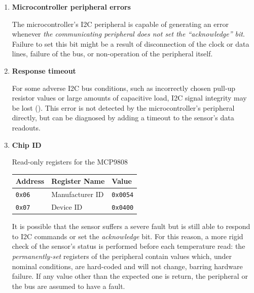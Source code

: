 \documentclass[a4paper,nobib]{tufte-book}
\begin{document}
\begin{enumerate}
	\item \textbf{Microcontroller peripheral errors}
	
	The microcontroller's \ac{I2C} peripheral is capable of generating an error whenever \emph{the communicating peripheral does not set the ``acknowledge'' bit}. Failure to set this bit might be a result of disconnection of the clock or data lines, failure of the bus, or non-operation of the peripheral itself.
	
	\item \textbf{Response timeout}
	
	For some adverse \ac{I2C} bus conditions, such as incorrectly chosen pull-up resistor values or large amounts of capacitive load, \ac{I2C} signal integrity may be lost (). This error is not detected by the microcontroller's peripheral directly, but can be diagnosed by adding a timeout to the sensor's data readouts.
	
	\item \textbf{Chip ID}
	
	\begin{margintable}
		\centering
		\caption{Read-only registers for the MCP9808}
		\label{tab:mcp9808readonly}
		\begin{tabularx}{\linewidth}{@{}lXl@{}}
			\toprule
			Address & Register Name & Value \\ \midrule
			\texttt{0x06} & Manufacturer ID & \texttt{0x0054} \\
			\texttt{0x07} & Device ID & \texttt{0x0400} \\ \bottomrule
		\end{tabularx}
	\end{margintable}
	
	It is possible that the sensor suffers a severe fault but is still able to respond to \ac{I2C} commands or set the \emph{acknowledge} bit. For this reason, a more rigid check of the sensor's status is performed before each temperature read: the \emph{permanently-set} registers of the peripheral contain values which, under nominal conditions, are hard-coded and will not change, barring hardware failure. If any value other than the expected one is return, the peripheral or the bus are assumed to have a fault.
\end{enumerate}
\end{document}
